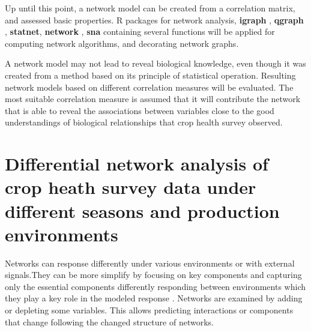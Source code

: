 Up until this point, a network model can be created from a correlation matrix, and assessed basic properties. R packages for network analysis, \textbf{igraph} , \textbf{qgraph} , \textbf{statnet}, \textbf{network} , \textbf{sna} containing several functions will be applied for computing  network algorithms, and decorating network graphs.


A network model may not lead to reveal biological knowledge, even though it was created from a method based on its principle of statistical operation. Resulting network models based on different correlation measures will be evaluated. The most suitable correlation measure is assumed that it will contribute the network that is able to reveal the associations between variables close to the good understandings of biological relationships that crop health survey observed.  

\section*{Differential network analysis of crop heath survey data under different seasons and production environments}

Networks can response differently under various environments or with external signals.They can be more simplify by focusing on key components and capturing only the essential components differently responding between environments which they play a key role in the modeled response . Networks are examined by adding or depleting some variables. This allows predicting interactions or components that change following the changed structure of networks. 

